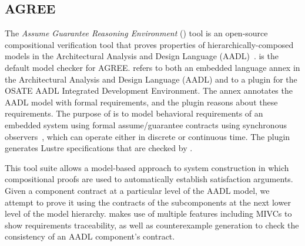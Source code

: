 \subsection{AGREE}

The {\em Assume Guarantee Reasoning Environment} (\agree) tool is
an open-source compositional verification tool that proves properties
of hierarchically-composed models in the Architectural Analysis and
Design Language (AADL)~\cite{NFM2012:CoGaMiWhLaLu,QFCS15:backes,hilt2013}.
\jkind is the default model checker for AGREE.  \agree
refers to both an embedded language annex in the Architectural
Analysis and Design Language (AADL) and to a plugin for the OSATE AADL
Integrated Development Environment. The \agree annex annotates the
AADL model with formal requirements, and the plugin reasons about
these requirements. The purpose of \agree is to model behavioral
requirements of an embedded system using formal assume/guarantee
contracts using synchronous observers~\cite{Halbwachs91:lustre}, which can operate either in discrete or continuous time. The plugin generates Lustre specifications that are checked by \jkind.


This tool suite allows a model-based approach to system construction in which compositional proofs are used to automatically establish satisfaction arguments.
Given a component contract at a particular level of the AADL model, we attempt to prove it using the contracts of the subcomponents at the next lower level of the model hierarchy.
\agree makes use of multiple \jkind features including MIVCs to show requirements traceability, as well as counterexample generation to check the consistency of an AADL
component's contract.



%

